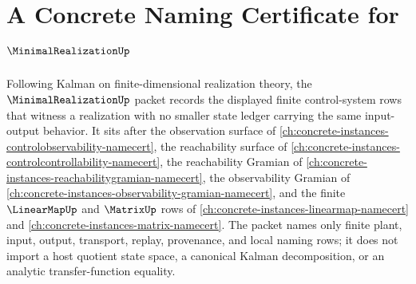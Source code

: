 \chapter{A Concrete Naming Certificate for $\MinimalRealizationUp$}
\label{ch:concrete-instances-minimal-realization-namecert}

Following Kalman on finite-dimensional realization theory, the $\MinimalRealizationUp$ packet records the displayed finite control-system rows that witness a realization with no smaller state ledger carrying the same input-output behavior. It sits after the observation surface of \autoref{ch:concrete-instances-controlobservability-namecert}, the reachability surface of \autoref{ch:concrete-instances-controlcontrollability-namecert}, the reachability Gramian of \autoref{ch:concrete-instances-reachabilitygramian-namecert}, the observability Gramian of \autoref{ch:concrete-instances-observability-gramian-namecert}, and the finite $\LinearMapUp$ and $\MatrixUp$ rows of \autoref{ch:concrete-instances-linearmap-namecert} and \autoref{ch:concrete-instances-matrix-namecert}. The packet names only finite plant, input, output, transport, replay, provenance, and local naming rows; it does not import a host quotient state space, a canonical Kalman decomposition, or an analytic transfer-function equality.

